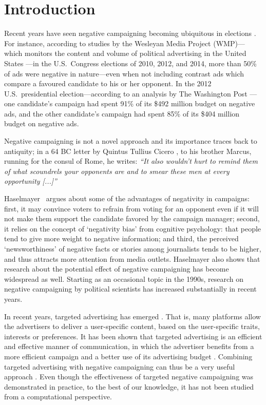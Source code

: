 \documentclass[letterpaper]{article} %
\begin{document}
\section{Introduction}
Recent years have seen negative campaigning becoming ubiquitous in elections \cite{mattes2014positive}. For instance, according to studies by the Wesleyan Media Project (WMP)---which monitors the content and volume of political advertising in the United States \cite{fowler2014political}---in the U.S.\ Congress elections of 2010, 2012, and 2014, more than 50\% of ads were negative in nature---even when not including contrast ads which compare a favoured candidate to his or her opponent. In the 2012 U.S.\ presidential election---according to an analysis by The Washington Post \cite{andrews2012}---
one candidate's campaign had spent 91\% of its \$492 million budget on negative ads, and the other candidate's campaign had spent 85\% of its \$404 million budget on negative ads.

Negative campaigning is not a novel approach and its importance  traces back to antiquity; in a 64 BC letter by Quintus Tullius Cicero \cite{cicero2012win}, to his brother Marcus, running for the consul of Rome,  he writes: \emph{``It also wouldn't hurt to remind them of what scoundrels your opponents are and to smear these men at every opportunity [...]''}

Haselmayer~ argues about some of the advantages of negativity in campaigns: first, it may convince voters to refrain from voting for an opponent even if it will not make them support the candidate favored by the campaign manager; second, it relies on the concept of `negativity bias' from cognitive psychology: that people tend to give more weight to negative information; and third, the perceived `newsworthiness' of negative facts or stories among journalists
tends to be higher, and thus attracts more attention from media outlets. 
Haselmayer also shows that research about the potential effect of negative campaigning has become widespread as well. Starting as an occasional topic in the 1990s, research on negative campaigning by political scientists has increased substantially in recent years.

In recent years, targeted advertising has emerged \cite{johnson2013targeted}. That is, many platforms allow the advertisers to deliver a user-specific content, based on the user-specific traits, interests or preferences. It has been shown that targeted advertising is an efficient and effective manner of communication, in which the advertiser benefits from a more efficient campaign and a better use of its advertising budget \cite{iyer2005targeting}. Combining targeted advertising with negative campaigning can thus be a very useful approach \cite{guardian-trump-facebook-ad}. Even though the effectiveness of targeted negative campaigning was demonstrated in practice, to the best of our knowledge, it has not been studied from a computational perspective. 
\end{document}
